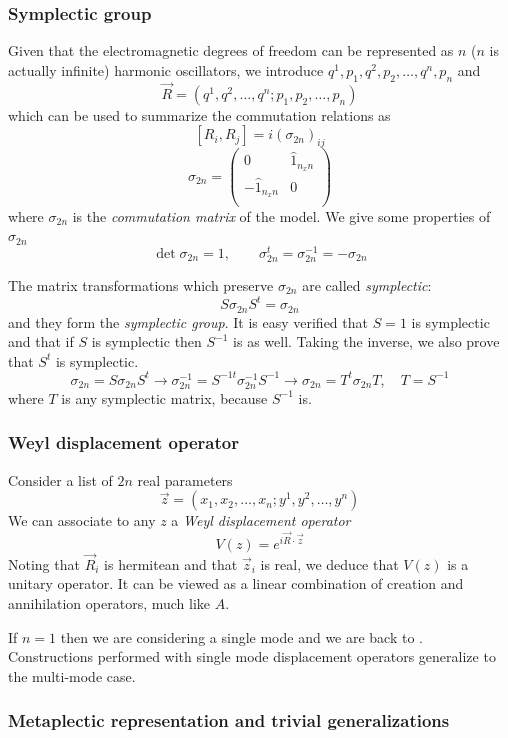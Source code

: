 \documentclass[a4paper, 11pt]{article}
\begin{document}
	\subsubsection{Symplectic group}
	Given that the electromagnetic degrees of freedom can be represented as $n$ ($n$ is actually infinite) harmonic oscillators, we introduce
	$q^1,p_1,q^2,p_2,\dots,q^n,p_n$ and
	\[ \vec{R} = (q^1,q^2,\dots,q^n;p_1,p_2,\dots,p_n) \]
	which can be used to summarize the commutation relations as
	\[ [R_i, R_j] = i (\sigma_{2n})_{ij} \]
	\[ \sigma_{2n} = \begin{pmatrix}
	0 & \hat{1}_{n _xn} \\
	-\hat{1}_{n _xn} & 0 \\
	\end{pmatrix} \]
	where $\sigma_{2n}$ is the \emph{commutation matrix} of the model. We give some properties of $\sigma_{2n}$
	\[ \det \sigma_{2n} = 1,\qquad \sigma_{2n}^t = \sigma_{2n}^{-1} = -\sigma_{2n} \]
	\vspace{2mm}
	
	\noindent The matrix transformations which preserve $\sigma_{2n}$ are called \emph{symplectic}:
	\[ S\sigma_{2n} S^t = \sigma_{2n} \]
	and they form the \emph{symplectic group}. It is easy verified that $S=1$ is symplectic and that if $S$ is symplectic then $S^{-1}$ is as well. Taking the inverse, we also prove that $S^t$ is symplectic.
	\[ \sigma_{2n} = S\sigma_{2n}S^t \rightarrow \sigma_{2n}^{-1} = S^{-1t}\sigma_{2n}^{-1} S^{-1} \rightarrow \sigma_{2n} = T^t \sigma_{2n} T,\quad T = S^{-1} \]
	where $T$ is any symplectic matrix, because $S^{-1}$ is.
	
	\subsubsection{Weyl displacement operator}
	Consider a list of $2n$ real parameters
	\[ \vec{z} = (x_1,x_2,\dots,x_n;y^1,y^2,\dots,y^n) \]
	We can associate to any $z$ a \emph{Weyl displacement operator}
	\[ V(z) = e^{i\vec{R}\cdot \vec{z}} \]
	Noting that $\vec{R}_i$ is hermitean and that $\vec{z}_i$ is real, we deduce that $V(z)$ is a unitary operator. It can be viewed as a linear combination of creation and annihilation operators, much like $A$.
	
	\noindent If $n=1$ then we are considering a single mode and we are back to . Constructions performed with single mode displacement operators generalize to the multi-mode case.
	
	\subsubsection{Metaplectic representation and trivial generalizations}
	
\end{document}
